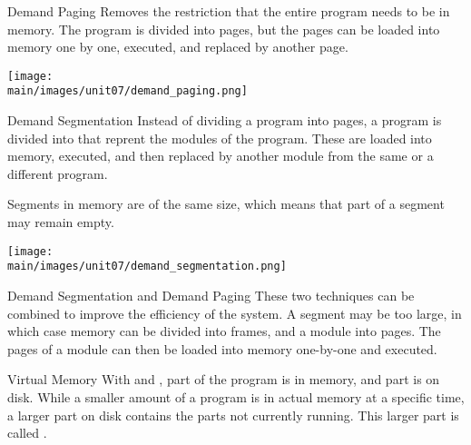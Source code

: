 \documentclass[\main/notes.tex]{subfiles}
\begin{document}
					\begin{definition}{Demand Paging}
						Removes the restriction that the entire program needs to be in memory. The program is divided into pages, but the pages can be loaded into memory one by one, executed, and replaced by another page.
						\begin{center}
							\texttt{[image: \\main/images/unit07/demand\_paging.png]}
						\end{center}
					\end{definition}
					\pagebreak
					\begin{definition}{Demand Segmentation}
						Instead of dividing a program into pages, a program is divided into  that reprent the modules of the program. These are loaded into memory, executed, and then replaced by another module from the same or a different program.

						Segments in memory are of the same size, which means that part of a segment may remain empty.
						\begin{center}
							\texttt{[image: \\main/images/unit07/demand\_segmentation.png]}
						\end{center}
					\end{definition}
					\begin{sidenote}{Demand Segmentation and Demand Paging}
						These two techniques can be combined to improve the efficiency of the system. A segment may be too large, in which case memory can be divided into frames, and a module into pages. The pages of a module can then be loaded into memory one-by-one and executed.
					\end{sidenote}
					\begin{definition}{Virtual Memory}
						With  and , part of the program is in memory, and part is on disk. While a smaller amount of a program is in actual memory at a specific time, a larger part on disk contains the parts not currently running. This larger part is called .
					\end{definition}
			\pagebreak
\end{document}
